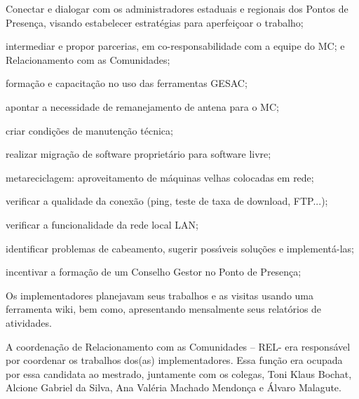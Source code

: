 \documentclass[
12pt,		%
openright,	%
twoside,  %
a4paper,			%
chapter=TITLE,		%
english,			%
french,				%
spanish,			%
brazil				%
]{USPSC-classe/USPSC}
\begin{document}
\begin{alineas}
\item Conectar e dialogar com os administradores estaduais e regionais dos Pontos de Presen\c{c}a, visando estabelecer estrat\'egias para aperfei\c{c}oar o trabalho;
\item intermediar e propor parcerias, em co-responsabilidade com a equipe do MC; e Relacionamento com as Comunidades;
\item forma\c{c}\~ao e capacita\c{c}\~ao no uso das ferramentas GESAC;
\item apontar a  necessidade de remanejamento de antena para o MC;
\item criar condi\c{c}\~oes de manuten\c{c}\~ao t\'ecnica;
\item realizar migra\c{c}\~ao de software propriet\'ario para software livre;
\item metareciclagem: aproveitamento de m\'aquinas velhas colocadas em rede;
\item verificar a qualidade da conex\~ao (ping, teste de taxa de download, FTP...);
\item verificar a funcionalidade da rede local LAN;
\item identificar problemas de cabeamento, sugerir poss\'{\i}veis solu\c{c}\~oes e implement\'a-las;
\item incentivar a forma\c{c}\~ao de um Conselho Gestor no Ponto de Presen\c{c}a;
\end{alineas}

Os implementadores planejavam seus trabalhos e as visitas usando uma ferramenta wiki, bem como, apresentando mensalmente seus relat\'orios de atividades.














A coordena\c{c}\~ao de Relacionamento com as Comunidades – REL- era respons\'avel por coordenar os trabalhos dos(as) implementadores. Essa fun\c{c}\~ao era ocupada por essa candidata ao mestrado,  juntamente com os colegas, Toni Klaus Bochat, Alcione  Gabriel da Silva, Ana Val\'eria Machado Mendon\c{c}a e \'Alvaro Malagute.
\end{document}
